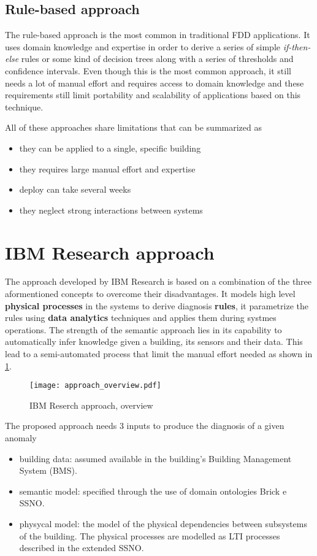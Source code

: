 \subsection{Rule-based approach} \label{subsec:rule_models}
The rule-based approach is the most common in traditional FDD applications. It uses domain knowledge and expertise in order to derive a series of simple \textit{if-then-else} rules or some kind of decision trees along with a series of thresholds and confidence intervals. Even though this is the most common approach, it still needs a lot of manual effort and requires access to domain knowledge and these requirements still limit portability and scalability of applications based on this technique.

All of these approaches share limitations that can be summarized as
\begin{itemize}
  \item they can be applied to a single, specific building
  \item they requires large manual effort and expertise
  \item deploy can take several weeks
  \item they neglect strong interactions between systems
\end{itemize}

\section{IBM Research approach}
The approach developed by IBM Research is based on a combination of the three aformentioned concepts to overcome their disadvantages. It models high level \textbf{physical processes} in the systems to derive diagnosis \textbf{rules}, it parametrize the rules using \textbf{data analytics} techniques and applies them during systmes operations. The strength of the semantic approach lies in its capability to automatically infer knowledge given a building, its sensors and their data. This lead to a semi-automated process that limit the manual effort needed as shown in \ref{fig:approach_overview}.

\begin{figure}
  \centering
  \texttt{[image: approach\_overview.pdf]}
  \caption{IBM Reserch approach, overview}
  \label{fig:approach_overview}
\end{figure}

The proposed approach needs 3 inputs to produce the diagnosis of a given anomaly
\begin{itemize}
  \item building data: assumed available in the building's Building Management System (BMS).
  \item semantic model: specified through the use of domain ontologies Brick e SSNO.
  \item physycal model: the model of the physical dependencies between subsystems of the building. The physical processes are modelled as LTI processes described in the extended SSNO.
\end{itemize}
